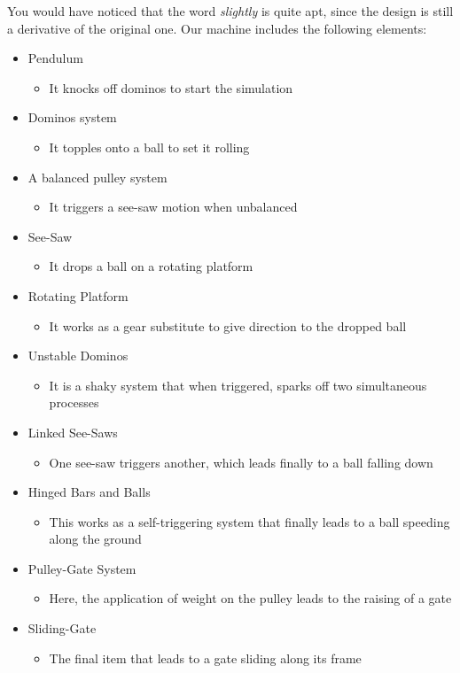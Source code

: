 \documentclass[a4paper,11pt]{article}
\begin{document}
You would have noticed that the word \emph{slightly} is quite apt, since the design is still a derivative of the original one. Our machine includes the following elements:

\begin{itemize}

\item Pendulum 
\begin{itemize}
\item It knocks off dominos to start the simulation
\end{itemize}
\item Dominos system
\begin{itemize}
\item It topples onto a ball to set it rolling
\end{itemize}
\item A balanced pulley system
\begin{itemize}
\item It triggers a see-saw motion when unbalanced
\end{itemize}
\item See-Saw
\begin{itemize}
\item It drops a ball on a rotating platform
\end{itemize}
\item Rotating Platform
\begin{itemize}
\item It works as a gear substitute to give direction to the dropped ball
\end{itemize}
\item Unstable Dominos
\begin{itemize}
\item It is a shaky system that when triggered, sparks off two simultaneous processes
\end{itemize}
\item Linked See-Saws
\begin{itemize}
\item One see-saw triggers another, which leads finally to a ball falling down
\end{itemize}
\item Hinged Bars and Balls
\begin{itemize}
\item This works as a self-triggering system that finally leads to a ball speeding along the ground
\end{itemize}
\item Pulley-Gate System
\begin{itemize}
\item Here, the application of weight on the pulley leads to the raising of a gate
\end{itemize}
\item Sliding-Gate
\begin{itemize}
\item The final item that leads to a gate sliding along its frame
\end{itemize}

\end{itemize}
\end{document}
